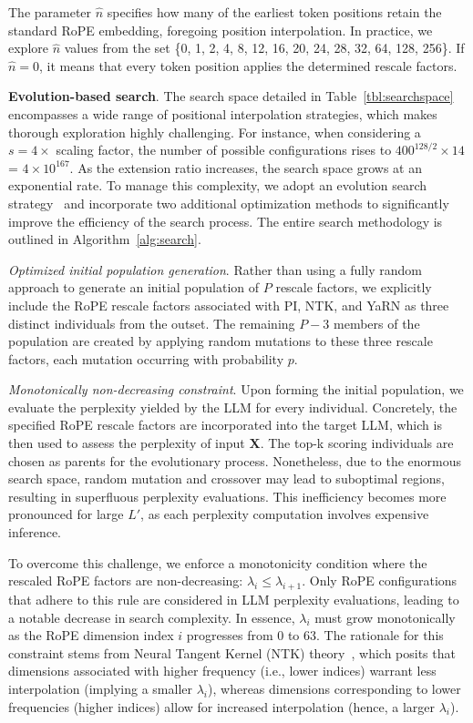 The parameter $\hat{n}$ specifies how many of the earliest token positions retain the standard RoPE embedding, foregoing position interpolation. In practice, we explore $\hat{n}$ values from the set \{0, 1, 2, 4, 8, 12, 16, 20, 24, 28, 32, 64, 128, 256\}. If $\hat{n}=0$, it means that every token position applies the determined rescale factors.

\textbf{Evolution-based search}. The search space detailed in Table~\ref{tbl:searchspace} encompasses a wide range of positional interpolation strategies, which makes thorough exploration highly challenging. For instance, when considering a $s=4\times$ scaling factor, the number of possible configurations rises to $400^{128/2}\times14$ = $4\times10^{167}$. As the extension ratio increases, the search space grows at an exponential rate. To manage this complexity, we adopt an evolution search strategy~\cite{guo2020single} and incorporate two additional optimization methods to significantly improve the efficiency of the search process. The entire search methodology is outlined in Algorithm~\ref{alg:search}.

\textit{Optimized initial population generation}. Rather than using a fully random approach to generate an initial population of $P$ rescale factors, we explicitly include the RoPE rescale factors associated with PI, NTK, and YaRN as three distinct individuals from the outset. The remaining $P - 3$ members of the population are created by applying random mutations to these three rescale factors, each mutation occurring with probability $p$.

\textit{Monotonically non-decreasing constraint}. Upon forming the initial population, we evaluate the perplexity yielded by the LLM for every individual. Concretely, the specified RoPE rescale factors are incorporated into the target LLM, which is then used to assess the perplexity of input $\mathbf{X}$. The top-k scoring individuals are chosen as parents for the evolutionary process. Nonetheless, due to the enormous search space, random mutation and crossover may lead to suboptimal regions, resulting in superfluous perplexity evaluations. This inefficiency becomes more pronounced for large $L'$, as each perplexity computation involves expensive inference.

To overcome this challenge, we enforce a monotonicity condition where the rescaled RoPE factors are non-decreasing: $\lambda_i \leq \lambda_{i+1}$. Only RoPE configurations that adhere to this rule are considered in LLM perplexity evaluations, leading to a notable decrease in search complexity. In essence, $\lambda_i$ must grow monotonically as the RoPE dimension index $i$ progresses from 0 to 63. The rationale for this constraint stems from Neural Tangent Kernel (NTK) theory~\cite{jacot2018neural,tancik2020fourier,ntk}, which posits that dimensions associated with higher frequency (i.e., lower indices) warrant less interpolation (implying a smaller $\lambda_i$), whereas dimensions corresponding to lower frequencies (higher indices) allow for increased interpolation (hence, a larger $\lambda_i$).

